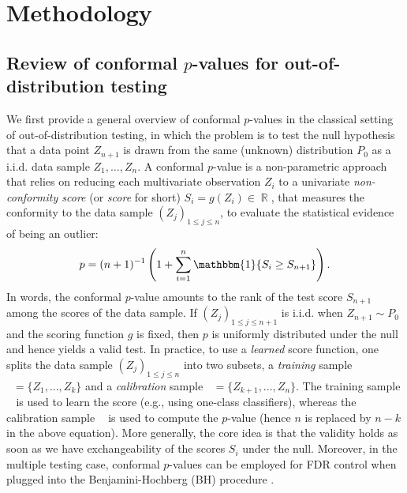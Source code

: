 \documentclass[a4paper, 11pt]{article}
\theoremstyle{remark}
\DeclareMathOperator{\ind}{\mathbbm{1}}
\DeclareMathOperator{\R}{\mathbb{R}}
\DeclareMathOperator{\Dtr}{\cD_{\text{train}}}
\DeclareMathOperator{\Dcal}{\cD_{\text{cal}}}
\newcommand{\EM}{\ensuremath}
\newcommand{\cD}{\EM{\mathcal{D}}}
\begin{document}
\section{Methodology} \label{lp:sec:meth}



\subsection{Review of conformal $p$-values for out-of-distribution testing} \label{lp:sec:meth:review}


We first provide a general overview of conformal $p$-values in the classical setting of out-of-distribution testing, in which the problem is to test the null hypothesis that a data point $Z_{n+1}$ is drawn from the same (unknown) distribution $P_0$ as a i.i.d. data sample $Z_1, \dots, Z_n$. 
A conformal $p$-value \citep{heller22, bates2023testing} is a non-parametric approach that relies on reducing each multivariate observation $Z_i$ to a univariate \textit{non-conformity score} (or \textit{score} for short) $S_{i}  = g(Z_i) \in \R$, that measures the conformity to the data sample $(Z_j)_{1 \leq j \leq n}$, to evaluate the statistical evidence of being an outlier:
$$ p =  (n+1)^{-1} \left( 1+ \sum_{i=1}^n \ind \{S_i \geq S_{n+1} \} \right).$$
In words, the conformal $p$-value amounts to the rank of the test score $S_{n+1}$ among the scores of the data sample. If $(Z_j)_{1 \leq j \leq n+1}$ is i.i.d. when $Z_{n+1} \sim P_0$ and the scoring function $g$ is fixed, then $p$ is uniformly distributed under the null and hence yields a valid test. 
In practice, to use a \textit{learned} score function, one splits the data sample $(Z_j)_{1 \leq j \leq n}$ into two subsets, a \textit{training} sample $\Dtr = \{Z_1,...,Z_k\}$ and a \textit{calibration} sample $\Dcal = \{Z_{k+1}, . . . , Z_n\}$. The training sample $\Dtr$ is used to learn the score (e.g., using one-class classifiers), whereas the calibration sample $\Dcal$ is used to compute the $p$-value (hence $n$ is replaced by $n-k$ in the above equation). 
More generally, the core idea is that the validity holds as soon as we have exchangeability of the scores $S_i$ under the null. 
Moreover, in the multiple testing case, conformal $p$-values 
can be employed for FDR control when plugged into the Benjamini-Hochberg (BH) procedure \citep{BH1995}  \citep{bates2023testing, liang2022integrative, marandon22b}. 
\end{document}
